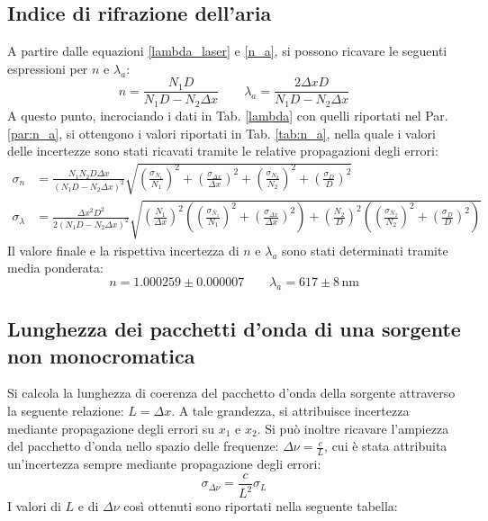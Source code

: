 \documentclass[]{article}
\let\oldsubsection\subsection%
\renewcommand{\subsection}{%
	\renewcommand{\theequation}{\thesubsection.\arabic{equation}}%
	\oldsubsection}%
\begin{document}
\subsection{Indice di rifrazione dell'aria}

A partire dalle equazioni \ref{lambda_laser} e \ref{n_a}, si possono ricavare le seguenti espressioni per $n$ e $\lambda_a$:
\begin{equation}
    \label{rifrazione}
    n = \frac{N_1 D}{N_1 D - N_2 \Delta x} \qquad
    \lambda_a = \frac{2\Delta x D}{N_1 D - N_2 \Delta x}
\end{equation}
A questo punto, incrociando i dati in Tab. \ref{lambda} con quelli riportati nel Par. \ref{par:n_a}, si ottengono i valori riportati in Tab. \ref{tab:n_a}, nella quale i valori delle incertezze sono stati ricavati tramite le relative propagazioni degli errori:
\begin{align}
    \label{rifrazione-err}
    \sigma_n &= \frac{N_1 N_2 D \Delta x}{\left(N_1 D - N_2 \Delta x\right)^2} \sqrt{\left(\frac{\sigma_{N_1}}{N_1}\right)^2 + \left(\frac{\sigma_{\Delta x}}{\Delta x}\right)^2 + \left(\frac{\sigma_{N_2}}{N_2}\right)^2 + \left(\frac{\sigma_{D}}{D}\right)^2} \\
    \sigma_{\lambda} &= \frac{\Delta x^2 D^2}{2\left(N_1 D - N_2 \Delta x\right)^2} \sqrt{\left(\frac{N_1}{\Delta x}\right)^2\left(\left(\frac{\sigma_{N_1}}{N_1}\right)^2 + \left(\frac{\sigma_{\Delta x}}{\Delta x}\right)^2\right) + \left(\frac{N_2}{D}\right)^2\left(\left(\frac{\sigma_{N_2}}{N_2}\right)^2 + \left(\frac{\sigma_{D}}{D}\right)^2\right)}
\end{align}
Il valore finale e la rispettiva incertezza di $n$ e $\lambda_a$ sono stati determinati tramite media ponderata:
\begin{equation}
    \label{n_a-lambda}
    n = 1.000259 \pm 0.000007 \qquad
    \lambda_a = 617 \pm 8 \, \text{nm}
\end{equation}

\subsection{Lunghezza dei pacchetti d'onda di una sorgente non monocromatica}
Si calcola la lunghezza di coerenza del pacchetto d'onda della sorgente attraverso la seguente relazione: $L=\Delta x$. A tale grandezza, si attribuisce incertezza mediante propagazione degli errori su $x_1$ e $x_2$. Si può inoltre ricavare l'ampiezza del pacchetto d'onda nello spazio delle frequenze: $\Delta \nu = \frac{c}{L}$, cui è stata attribuita un'incertezza sempre mediante propagazione degli errori:
\begin{equation}
    \label{sigma-nu}
    \sigma_{\Delta \nu} = \frac{c}{L^2} \sigma_L
\end{equation}
I valori di $L$ e di $\Delta \nu$ così ottenuti sono riportati nella seguente tabella:
\end{document}
